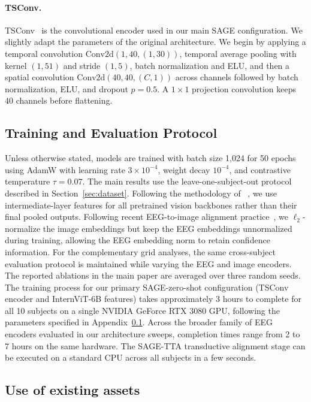 \documentclass{article}
\begin{document}
\paragraph{TSConv.}
TSConv~\cite{song2024nice} is the convolutional encoder used in our main SAGE configuration. We slightly adapt the parameters of the original architecture. We begin by applying a temporal convolution $\mathrm{Conv2d}(1, 40, (1, 30))$, temporal average pooling with kernel $(1, 51)$ and stride $(1, 5)$, batch normalization and ELU, and then a spatial convolution $\mathrm{Conv2d}(40, 40, (C, 1))$ across channels followed by batch normalization, ELU, and dropout $p=0.5$. A $1 \times 1$ projection convolution keeps 40 channels before flattening. 

\subsection{Training and Evaluation Protocol}
\label{app:training-details}

Unless otherwise stated, models are trained with batch size 1{,}024 for 50 epochs using AdamW with learning rate $3\times10^{-4}$, weight decay $10^{-4}$, and contrastive temperature $\tau = 0.07$. The main results use the leave-one-subject-out protocol described in Section~\ref{sec:dataset}. Following the methodology of ~\cite{du2025shallow}, we use intermediate-layer features for all pretrained vision backbones rather than their final pooled outputs. Following recent EEG-to-image alignment practice~\cite{kneeland2025enigma,zhang2025neurobridge}, we $\ell_2$-normalize the image embeddings but keep the EEG embeddings unnormalized during training, allowing the EEG embedding norm to retain confidence information. For the complementary grid analyses, the same cross-subject evaluation protocol is maintained while varying the EEG and image encoders. The reported ablations in the main paper are averaged over three random seeds. The training process for our primary SAGE-zero-shot configuration (TSConv encoder and InternViT-6B features) takes approximately 3 hours to complete for all 10 subjects on a single NVIDIA GeForce RTX 3080 GPU, following the parameters specified in Appendix~\ref{app:training-details}. Across the broader family of EEG encoders evaluated in our architecture sweeps, completion times range from 2 to 7 hours on the same hardware. The SAGE-TTA transductive alignment stage can be executed on a standard CPU across all subjects in a few seconds.

\subsection{Use of existing assets}
\label{app:existing-assets}
\end{document}
